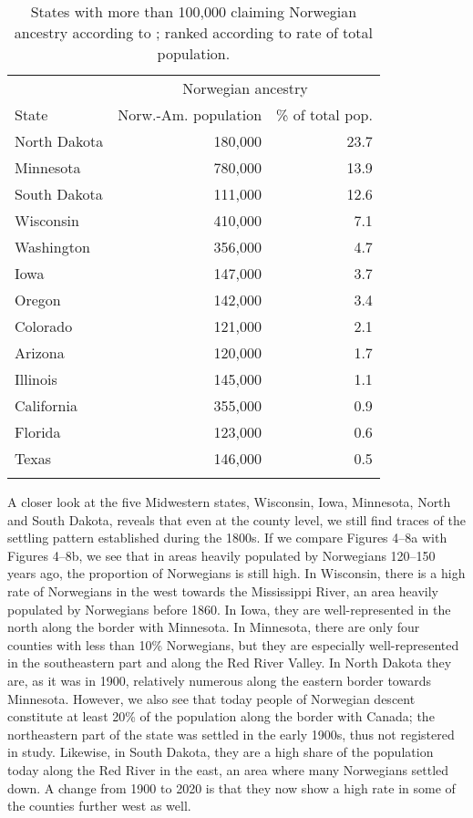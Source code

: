 \documentclass[output=paper]{langscibook}
\begin{document}
\begin{table}
\begin{tabular}{lrr}
\lsptoprule
      &  \multicolumn{2}{c}{Norwegian ancestry}\\\cmidrule(lr){2-3}
State &  Norw.-Am. population & \% of total pop.\\\midrule
North Dakota  &  180,000 & 23.7\\
Minnesota     &  780,000 & 13.9\\
South Dakota  &  111,000 & 12.6\\
Wisconsin     &  410,000 &  7.1\\
Washington    &  356,000 &  4.7\\
Iowa          &  147,000 &  3.7\\
Oregon        &  142,000 &  3.4\\
Colorado      &  121,000 &  2.1\\
Arizona       &  120,000 &  1.7\\
Illinois      &  145,000 &  1.1\\
California    &  355,000 &  0.9\\
Florida       &  123,000 &  0.6\\
Texas         &  146,000 &  0.5\\
\lspbottomrule
\end{tabular}
\caption{States with more than 100,000 claiming Norwegian ancestry according to \citet{USCensus2020}; ranked according to rate of total population.}
\label{tab:hjelde:2}
\end{table}

A closer look at the five Midwestern states, Wisconsin, Iowa, Minnesota, North and South Dakota, reveals that even at the county level, we still find traces of the settling pattern established during the 1800s. If we compare Figures 4--8a with Figures 4--8b, we see that in areas heavily populated by Norwegians 120--150 years ago, the proportion of Norwegians is still high. In Wisconsin, there is a high rate of Norwegians in the west towards the Mississippi River, an area heavily populated by Norwegians before 1860. In Iowa, they are well-represented in the north along the border with Minnesota. In Minnesota, there are only four counties with less than 10\% Norwegians, but they are especially well-represented in the southeastern part and along the Red River Valley. In North Dakota they are, as it was in 1900, relatively numerous along the eastern border towards Minnesota. However, we also see that today people of Norwegian descent constitute at least 20\% of the population along the border with Canada; the northeastern part of the state was settled in the early 1900s, thus not registered in  study. Likewise, in South Dakota, they are a high share of the population today along the Red River in the east, an area where many Norwegians settled down. A change from 1900 to 2020 is that they now show a high rate in some of the counties further west as well.
\end{document}

